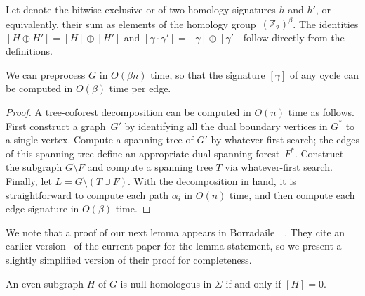 \documentclass[letterpaper,review]{siamart190516}
\def\Z{\mathbb{Z}}
\def\cycle{\gamma}
\def\dualarc{\alpha}
\begin{document}
Let  denote the bitwise exclusive-or of two homology signatures $h$ and $h'$, or equivalently, their sum as elements of the homology group~$(\Z_2)^\beta$.  The identities $[H \oplus H'] = [H] \oplus [H']$ and $[\cycle\cdot\cycle'] = [\cycle] \oplus [\cycle']$ follow directly from the definitions.

\begin{lemma}
\label{lem:sign}
We can preprocess $G$ in $O(\beta n)$ time, so that the signature $[\cycle]$ of any cycle can be computed in $O(\beta)$ time per edge.
\end{lemma}

\begin{proof}
A tree-coforest decomposition can be computed in $O(n)$ time as follows.  First construct a graph~$G'$ by identifying all the dual boundary vertices in $G^*$ to a single vertex.  Compute a spanning tree of $G'$ by whatever-first search; the edges of this spanning tree define an appropriate dual spanning forest~$F^*$.  Construct the subgraph $G\setminus F$ and compute a spanning tree $T$ via whatever-first search.  Finally, let $L = G\setminus (T\cup F)$.  With the decomposition in hand, it is straightforward to compute each path $\dualarc_i$ in $O(n)$ time, and then compute each edge signature in $O(\beta)$ time.
\end{proof}

We note that a proof of our next lemma appears in Borradaile~\etal~\cite[Corollary 3.5]{bcfn-mchbs-17}.
They cite an earlier version~\cite{en-mcsnc-11} of the current paper for the lemma statement, so we
present a slightly simplified version of their proof for completeness.

\begin{lemma}
An even subgraph $H$ of $G$ is null-homologous in $\Sigma$ if and only if $[H] = 0$.
\end{lemma}
\end{document}
